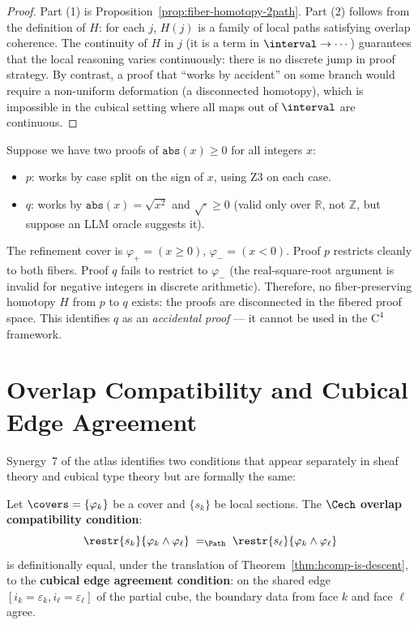 \begin{proof}
Part (1) is Proposition~\ref{prop:fiber-homotopy-2path}.  Part (2) follows
from the definition of $H$: for each $j$, $H(j)$ is a family of local paths
satisfying overlap coherence.  The continuity of $H$ in $j$ (it is a term
in $\interval \to \cdots$) guarantees that the local reasoning varies
continuously: there is no discrete jump in proof strategy.  By contrast,
a proof that ``works by accident'' on some branch would require a
non-uniform deformation (a disconnected homotopy), which is impossible in
the cubical setting where all maps out of $\interval$ are continuous.
\end{proof}

\begin{example}
Suppose we have two proofs of $\mathtt{abs}(x) \geq 0$ for all integers $x$:
\begin{itemize}
\item $p$: works by case split on the sign of $x$, using Z3 on each case.
\item $q$: works by $\mathtt{abs}(x) = \sqrt{x^2}$ and $\sqrt{\cdot} \geq 0$
  (valid only over $\mathbb{R}$, not $\mathbb{Z}$, but suppose an LLM oracle
  suggests it).
\end{itemize}
The refinement cover is $\varphi_+ = (x \geq 0)$, $\varphi_- = (x < 0)$.
Proof $p$ restricts cleanly to both fibers.  Proof $q$ fails to restrict
to $\varphi_-$ (the real-square-root argument is invalid for negative
integers in discrete arithmetic).  Therefore, no fiber-preserving homotopy
$H$ from $p$ to $q$ exists: the proofs are disconnected in the fibered
proof space.  This identifies $q$ as an \emph{accidental proof} --- it
cannot be used in the $\mathrm{C}^4$ framework.
\end{example}


\section{Overlap Compatibility and Cubical Edge Agreement}
\label{sec:overlap-edge}

Synergy~7 of the atlas identifies two conditions that appear separately in
sheaf theory and cubical type theory but are formally the same:

\begin{proposition}[Overlap Compatibility = Cubical Edge Agreement]
\label{prop:overlap-is-edge}
Let $\covers = \{\varphi_k\}$ be a cover and $\{s_k\}$ be local sections.
The \textbf{$\Cech$ overlap compatibility condition}:
\[
  \restr{s_k}{\varphi_k \wedge \varphi_\ell}
  \;=_{\Path}\;
  \restr{s_\ell}{\varphi_k \wedge \varphi_\ell}
\]
is definitionally equal, under the translation of
Theorem~\ref{thm:hcomp-is-descent}, to the \textbf{cubical edge agreement
condition}: on the shared edge $[i_k = \varepsilon_k, i_\ell =
\varepsilon_\ell]$ of the partial cube, the boundary data from face $k$
and face $\ell$ agree.
\end{proposition}

